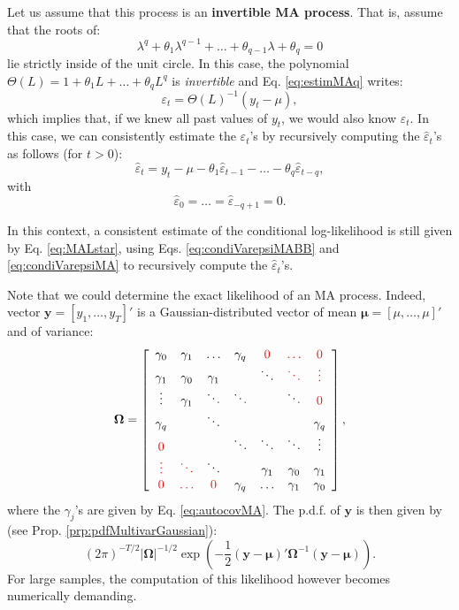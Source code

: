 \documentclass[
  12pt,
]{book}
\theoremstyle{definition}
\theoremstyle{definition}
\theoremstyle{definition}
\theoremstyle{definition}
\theoremstyle{remark}
\begin{document}
Let us assume that this process is an \textbf{invertible MA process}. That is, assume that the roots of:
\begin{equation}
\lambda^q + \theta_1 \lambda^{q-1} + \dots + \theta_{q-1} \lambda + \theta_q = 0 \label{eq:invertible}
\end{equation}
lie strictly inside of the unit circle. In this case, the polynomial \(\Theta(L)=1 + \theta_1 L + \dots + \theta_q L^q\) is \emph{invertible} and Eq. \eqref{eq:estimMAq} writes:
\[
\varepsilon_t = \Theta(L)^{-1}(y_t - \mu),
\]
which implies that, if we knew all past values of \(y_t\), we would also know \(\varepsilon_t\). In this case, we can consistently estimate the \(\varepsilon_t\)'s by recursively computing the \(\hat\varepsilon_t\)'s as follows (for \(t>0\)):
\begin{equation}
\hat\varepsilon_t = y_t - \mu - \theta_1 \hat\varepsilon_{t-1} - \dots  - \theta_q \hat\varepsilon_{t-q},\label{eq:condiVarepsiMABB}
\end{equation}
with
\begin{equation}
\hat\varepsilon_{0}=\dots=\hat\varepsilon_{-q+1}=0.\label{eq:condiVarepsiMA}
\end{equation}

In this context, a consistent estimate of the conditional log-likelihood is still given by Eq. \eqref{eq:MALstar}, using Eqs. \eqref{eq:condiVarepsiMABB} and \eqref{eq:condiVarepsiMA} to recursively compute the \(\hat\varepsilon_t\)'s.

Note that we could determine the exact likelihood of an MA process. Indeed, vector \(\mathbf{y} = [y_1,\dots,y_T]'\) is a Gaussian-distributed vector of mean \(\boldsymbol\mu = [\mu,\dots,\mu]'\) and of variance:
\[
\boldsymbol\Omega = \left[\begin{array}{ccccccc}
\gamma_0 & \gamma_1&\dots&\gamma_q&{\color{red}0}&{\color{red}\dots}&{\color{red}0}\\
\gamma_1 & \gamma_0&\gamma_1&&\ddots&{\color{red}\ddots}&{\color{red}\vdots}\\
\vdots & \gamma_1&\ddots&\ddots&&\ddots&{\color{red}0}\\
\gamma_q &&\ddots&&&&\gamma_q\\
{\color{red}0} &&&\ddots&\ddots&\ddots&\vdots\\
{\color{red}\vdots}&{\color{red}\ddots}&\ddots&&\gamma_1&\gamma_0&\gamma_1\\
{\color{red}0}&{\color{red}\dots}&{\color{red}0}&\gamma_q&\dots&\gamma_1&\gamma_0
\end{array}\right],
\]
where the \(\gamma_j\)'s are given by Eq. \eqref{eq:autocovMA}. The p.d.f. of \(\mathbf{y}\) is then given by (see Prop. \ref{prp:pdfMultivarGaussian}):
\[
(2\pi)^{-T/2}|\boldsymbol\Omega|^{-1/2}\exp\left( -\frac{1}{2} (\mathbf{y}-\boldsymbol\mu)' \boldsymbol\Omega^{-1} (\mathbf{y}-\boldsymbol\mu)\right).
\]
For large samples, the computation of this likelihood however becomes numerically demanding.
\end{document}
